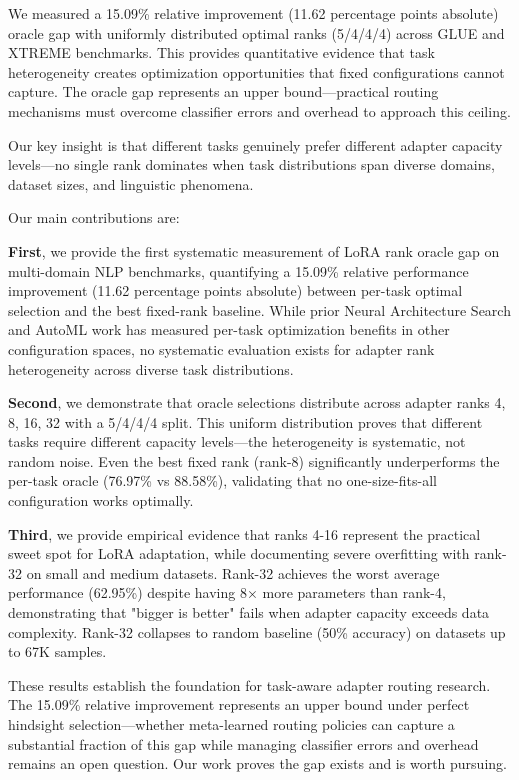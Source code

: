 
We measured a 15.09\% relative improvement (11.62 percentage points absolute) oracle gap with uniformly distributed optimal ranks (5/4/4/4) across GLUE and XTREME benchmarks. This provides quantitative evidence that task heterogeneity creates optimization opportunities that fixed configurations cannot capture. The oracle gap represents an upper bound—practical routing mechanisms must overcome classifier errors and overhead to approach this ceiling.

Our key insight is that different tasks genuinely prefer different adapter capacity levels—no single rank dominates when task distributions span diverse domains, dataset sizes, and linguistic phenomena.

Our main contributions are:

\textbf{First}, we provide the first systematic measurement of LoRA rank oracle gap on multi-domain NLP benchmarks, quantifying a 15.09\% relative performance improvement (11.62 percentage points absolute) between per-task optimal selection and the best fixed-rank baseline. While prior Neural Architecture Search and AutoML work has measured per-task optimization benefits in other configuration spaces, no systematic evaluation exists for adapter rank heterogeneity across diverse task distributions.

\textbf{Second}, we demonstrate that oracle selections distribute across adapter ranks {4, 8, 16, 32} with a 5/4/4/4 split. This uniform distribution proves that different tasks require different capacity levels—the heterogeneity is systematic, not random noise. Even the best fixed rank (rank-8) significantly underperforms the per-task oracle (76.97\% vs 88.58\%), validating that no one-size-fits-all configuration works optimally.

\textbf{Third}, we provide empirical evidence that ranks 4-16 represent the practical sweet spot for LoRA adaptation, while documenting severe overfitting with rank-32 on small and medium datasets. Rank-32 achieves the worst average performance (62.95\%) despite having 8× more parameters than rank-4, demonstrating that "bigger is better" fails when adapter capacity exceeds data complexity. Rank-32 collapses to random baseline (50\% accuracy) on datasets up to 67K samples.

These results establish the foundation for task-aware adapter routing research. The 15.09\% relative improvement represents an upper bound under perfect hindsight selection—whether meta-learned routing policies can capture a substantial fraction of this gap while managing classifier errors and overhead remains an open question. Our work proves the gap exists and is worth pursuing.

